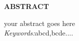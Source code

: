 \newpage
\newpage
{}
\begin{center}
{\large \bf ABSTRACT}
\end{center}
your abstract goes here\\

{\it Keywords:}abcd,bcde....

